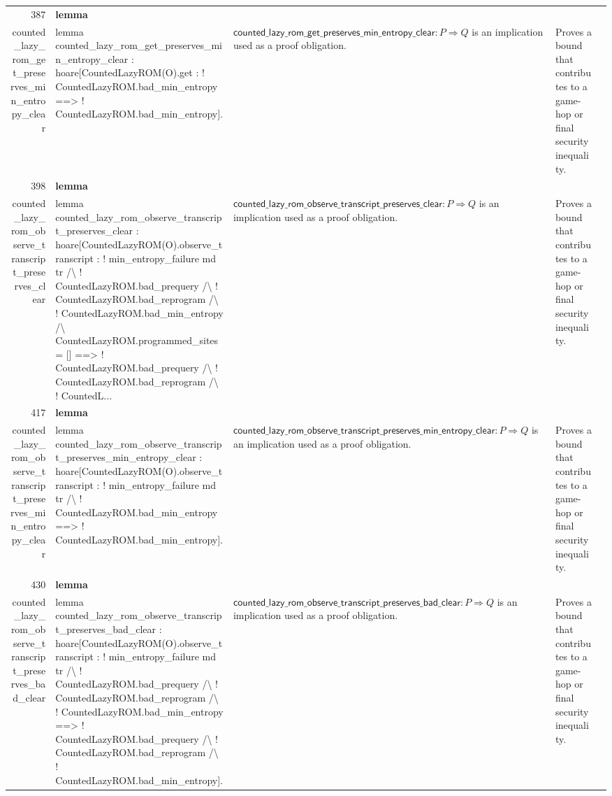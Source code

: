 \documentclass[10pt]{article}
\newcommand{\ec}[1]{\begingroup\ttfamily\scriptsize #1\endgroup}
\begin{document}
\begin{longtable}{r L{0.17\textwidth} L{0.26\textwidth} L{0.27\textwidth} L{0.20\textwidth}}
387 & \textbf{lemma}\\\ec{counted\_lazy\_rom\_get\_preserves\_min\_entropy\_clear} & \ec{lemma counted\_lazy\_rom\_get\_preserves\_min\_entropy\_clear : hoare[CountedLazyROM(O).get : ! CountedLazyROM.bad\_min\_entropy ==> ! CountedLazyROM.bad\_min\_entropy].} & \(\mathsf{counted\_lazy\_rom\_get\_preserves\_min\_entropy\_clear} : P \Rightarrow Q\) is an implication used as a proof obligation. & Proves a bound that contributes to a game-hop or final security inequality. \\
398 & \textbf{lemma}\\\ec{counted\_lazy\_rom\_observe\_transcript\_preserves\_clear} & \ec{lemma counted\_lazy\_rom\_observe\_transcript\_preserves\_clear : hoare[CountedLazyROM(O).observe\_transcript : ! min\_entropy\_failure md tr /\textbackslash{} ! CountedLazyROM.bad\_prequery /\textbackslash{} ! CountedLazyROM.bad\_reprogram /\textbackslash{} ! CountedLazyROM.bad\_min\_entropy /\textbackslash{} CountedLazyROM.programmed\_sites = [] ==> ! CountedLazyROM.bad\_prequery /\textbackslash{} ! CountedLazyROM.bad\_reprogram /\textbackslash{} ! CountedL...} & \(\mathsf{counted\_lazy\_rom\_observe\_transcript\_preserves\_clear} : P \Rightarrow Q\) is an implication used as a proof obligation. & Proves a bound that contributes to a game-hop or final security inequality. \\
417 & \textbf{lemma}\\\ec{counted\_lazy\_rom\_observe\_transcript\_preserves\_min\_entropy\_clear} & \ec{lemma counted\_lazy\_rom\_observe\_transcript\_preserves\_min\_entropy\_clear : hoare[CountedLazyROM(O).observe\_transcript : ! min\_entropy\_failure md tr /\textbackslash{} ! CountedLazyROM.bad\_min\_entropy ==> ! CountedLazyROM.bad\_min\_entropy].} & \(\mathsf{counted\_lazy\_rom\_observe\_transcript\_preserves\_min\_entropy\_clear} : P \Rightarrow Q\) is an implication used as a proof obligation. & Proves a bound that contributes to a game-hop or final security inequality. \\
430 & \textbf{lemma}\\\ec{counted\_lazy\_rom\_observe\_transcript\_preserves\_bad\_clear} & \ec{lemma counted\_lazy\_rom\_observe\_transcript\_preserves\_bad\_clear : hoare[CountedLazyROM(O).observe\_transcript : ! min\_entropy\_failure md tr /\textbackslash{} ! CountedLazyROM.bad\_prequery /\textbackslash{} ! CountedLazyROM.bad\_reprogram /\textbackslash{} ! CountedLazyROM.bad\_min\_entropy ==> ! CountedLazyROM.bad\_prequery /\textbackslash{} ! CountedLazyROM.bad\_reprogram /\textbackslash{} ! CountedLazyROM.bad\_min\_entropy].} & \(\mathsf{counted\_lazy\_rom\_observe\_transcript\_preserves\_bad\_clear} : P \Rightarrow Q\) is an implication used as a proof obligation. & Proves a bound that contributes to a game-hop or final security inequality. \\

\end{longtable}
\end{document}
